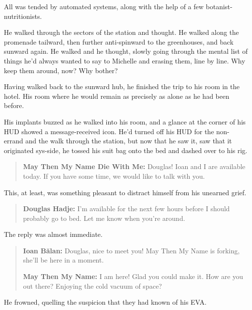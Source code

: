 All was tended by automated systems, along with the help of a few botanist-nutritionists.

He walked through the sectors of the station and thought. He walked along the promenade tailward, then further anti-spinward to the greenhouses, and back sunward again. He walked and he thought, slowly going through the mental list of things he'd always wanted to say to Michelle and erasing them, line by line. Why keep them around, now? Why bother?

Having walked back to the sunward hub, he finished the trip to his room in the hotel. His room where he would remain as precisely as alone as he had been before.

His implants buzzed as he walked into his room, and a glance at the corner of his HUD showed a message-received icon. He'd turned off his HUD for the non-errand and the walk through the station, but now that he saw it, saw that it originated sys-side, he tossed his suit bag onto the bed and dashed over to his rig.

\begin{quote}
\textbf{May Then My Name Die With Me:} Douglas! Ioan and I are available today. If you have some time, we would like to talk with you.
\end{quote}

\noindent This, at least, was something pleasant to distract himself from his unearned grief.

\begin{quote}
\textbf{Douglas Hadje:} I'm available for the next few hours before I should probably go to bed. Let me know when you're around.
\end{quote}

\noindent The reply was almost immediate.

\begin{quote}
\textbf{Ioan Bălan:} Douglas, nice to meet you! May Then My Name is forking, she'll be here in a moment.

\textbf{May Then My Name:} I am here! Glad you could make it. How are you out there? Enjoying the cold vacuum of space?
\end{quote}

\noindent He frowned, quelling the suspicion that they had known of his EVA.

